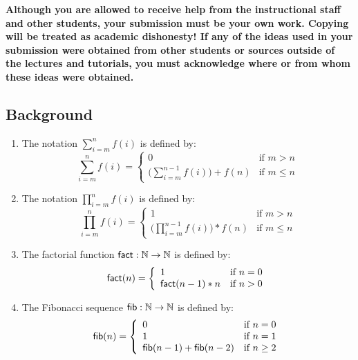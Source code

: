 \documentclass[11pt,fleqn]{article}
\newcommand{\mname}[1]{\mbox{\sf #1}}
\begin{document}
\textbf{Although you are allowed to receive help from the
  instructional staff and other students, your submission must be your
  own work.  Copying will be treated as academic dishonesty! If any of
  the ideas used in your submission were obtained from other students
  or sources outside of the lectures and tutorials, you must
  acknowledge where or from whom these ideas were obtained.}

\subsection*{Background}

\begin{enumerate}

  \item The notation $\sum^{n}_{i=m}f(i)$ is defined by: 
    \[\sum^{n}_{i=m}f(i) =
      \left\{\begin{array}{ll}
               0                            & \textrm{if } m > n\\
               \big(\sum^{n-1}_{i=m}f(i)\big) + f(n) & \textrm{if } m \le n
             \end{array}
      \right.\]

  \item The notation $\prod^{n}_{i=m}f(i)$ is defined by: 
    \[\prod^{n}_{i=m}f(i) =
      \left\{\begin{array}{ll}
               1                             & \textrm{if } m > n\\
               \big(\prod^{n-1}_{i=m}f(i)\big) * f(n) & \textrm{if } m \le n
             \end{array}
      \right.\] 

  \item The factorial function $\mname{fact} : \mathbb{N} \rightarrow
    \mathbb{N}$ is defined by:
    \[\mname{fact}(n) = 
      \left\{\begin{array}{ll}
               1 & \textrm{if } n = 0 \\
               \mname{fact}(n-1) * n & \textrm{if } n > 0 
             \end{array}
      \right.\]

  \item The Fibonacci sequence $\mname{fib} : \mathbb{N} \rightarrow
    \mathbb{N}$ is defined by:
    \[\mname{fib}(n) = 
      \left\{\begin{array}{ll}
               0 & \textrm{if } n = 0 \\
               1 & \textrm{if } n = 1 \\
               \mname{fib}(n-1) + \mname{fib}(n-2) & \textrm{if } n \ge 2
             \end{array}
      \right.\]

\end{enumerate}
\end{document}
